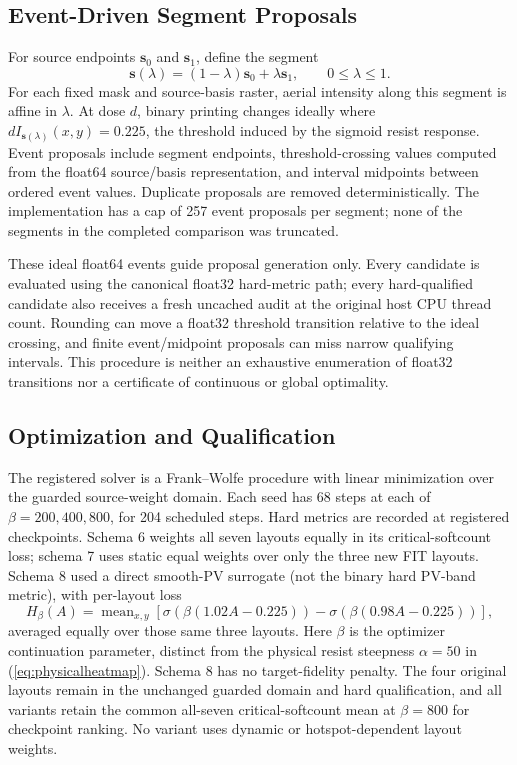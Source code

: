 \documentclass[conference]{IEEEtran}
\begin{document}
\subsection{Event-Driven Segment Proposals}
For source endpoints $\mathbf{s}_0$ and $\mathbf{s}_1$, define the segment
\begin{equation}
 \mathbf{s}(\lambda)=(1-\lambda)\mathbf{s}_0+\lambda\mathbf{s}_1,
 \qquad 0\leq\lambda\leq1.
 \label{eq:segment}
\end{equation}
For each fixed mask and source-basis raster, aerial intensity along this segment is affine in $\lambda$. At dose $d$, binary printing changes ideally where $dI_{\mathbf{s}(\lambda)}(x,y)=0.225$, the threshold induced by the sigmoid resist response. Event proposals include segment endpoints, threshold-crossing values computed from the float64 source/basis representation, and interval midpoints between ordered event values. Duplicate proposals are removed deterministically. The implementation has a cap of 257 event proposals per segment; none of the segments in the completed comparison was truncated.

These ideal float64 events guide proposal generation only. Every candidate is evaluated using the canonical float32 hard-metric path; every hard-qualified candidate also receives a fresh uncached audit at the original host CPU thread count. Rounding can move a float32 threshold transition relative to the ideal crossing, and finite event/midpoint proposals can miss narrow qualifying intervals. This procedure is neither an exhaustive enumeration of float32 transitions nor a certificate of continuous or global optimality.

\subsection{Optimization and Qualification}
\label{sec:optimization}
The registered solver is a Frank--Wolfe procedure with linear minimization over the guarded source-weight domain. Each seed has 68 steps at each of $\beta=200,400,800$, for 204 scheduled steps. Hard metrics are recorded at registered checkpoints. Schema 6 weights all seven layouts equally in its critical-softcount loss; schema 7 uses static equal weights over only the three new FIT layouts. Schema 8 used a direct smooth-PV surrogate (not the binary hard PV-band metric), with per-layout loss
\begin{equation}
 H_{\beta}(A)=\operatorname{mean}_{x,y}\left[\sigma\!\left(\beta(1.02A-0.225)\right)-\sigma\!\left(\beta(0.98A-0.225)\right)\right],
 \label{eq:optimizerpv}
\end{equation}
averaged equally over those same three layouts. Here $\beta$ is the optimizer continuation parameter, distinct from the physical resist steepness $\alpha=50$ in (\ref{eq:physicalheatmap}). Schema 8 has no target-fidelity penalty. The four original layouts remain in the unchanged guarded domain and hard qualification, and all variants retain the common all-seven critical-softcount mean at $\beta=800$ for checkpoint ranking. No variant uses dynamic or hotspot-dependent layout weights.
\end{document}
